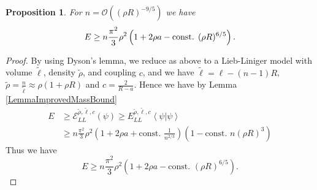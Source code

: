 \documentclass[a4paper,11pt]{article}
\renewcommand{\braket}[1]{\left\langle#1\right\rangle}
\newtheorem{proposition}{Proposition}
\numberwithin{equation}{section}
\begin{document}
		\begin{proposition}
		For $ n=\mathcal{O}((\rho R)^{-9/5}) $ we have \begin{equation}
		E\geq n\frac{\pi^2}{3}\rho^2\left(1+2\rho a-\textnormal{const. }(\rho R)^{6/5}\right).
		\end{equation}
	\end{proposition}
	\begin{proof}
		By using Dyson's lemma, we reduce as above to a Lieb-Liniger model with volume $ \tilde{\ell} $, density $ \tilde{\rho} $, and coupling $ c $, and we have $ \tilde{\ell}=\ell-(n-1)R $, $ \tilde{\rho}=\frac{n}{\tilde{\ell}}\approx\rho (1+\rho R) $ and $ c=\frac{2}{R-a} $. Hence we have by Lemma \ref{LemmaImprovedMassBound} \begin{equation}
		\begin{aligned}
		E&\geq \mathcal{E}_{LL}^{\tilde{\rho},\tilde{\ell},c}(\psi)\geq E_{LL}^{\tilde{\rho},\tilde{\ell},c}\braket{\psi|\psi}\\&\geq
		n\frac{\pi^2}{3}\rho^2\left(1+2\rho a+\text{const. }\frac{1}{n^{2/3}}\right)(1-\text{const. }n(\rho R)^3)
		\end{aligned}
		\end{equation}
		 Thus we have \begin{equation}
		E\geq n\frac{\pi^2}{3}\rho^2\left(1+2\rho a-\text{const. }(\rho R)^{6/5}\right).
		\end{equation}
	\end{proof}
	
	
	
\end{document}
